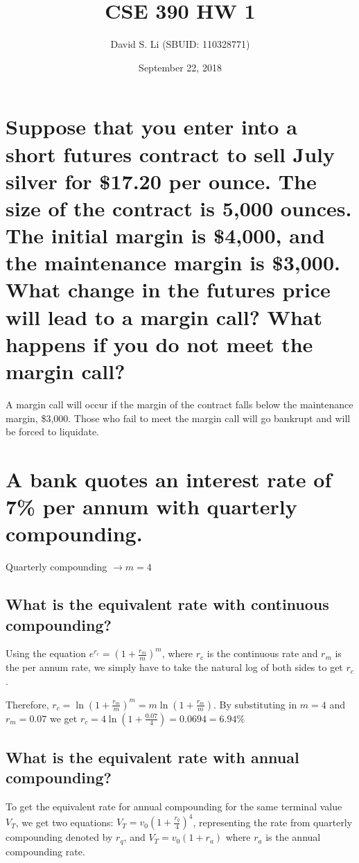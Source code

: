 \documentclass{article}
\title{CSE 390 HW 1}
\author{David S. Li (SBUID: 110328771)}
\date{September 22, 2018}
\begin{document}
\maketitle

\section{Suppose that you enter into a short futures contract to sell July silver for \$17.20 per ounce. The size of the contract is 5,000 ounces. The initial margin is \$4,000, and the maintenance margin is \$3,000. What change in the futures price will lead to a margin call? What happens if you do not meet the margin call?}

\par\noindent\large A margin call will occur if the margin of the contract falls below the maintenance margin, \$3,000.  Those who fail to meet the margin call will go bankrupt and will be forced to liquidate.

\section{A bank quotes an interest rate of 7\% per annum with quarterly compounding.}

\par\noindent\Large Quarterly compounding $\rightarrow m = 4$ 

\subsection{What is the equivalent rate with continuous compounding?}
\par\noindent\Large Using the equation $e^{r_{c}} = (1 + \frac{r_{m}}{m})^{m}$, where $r_{c}$ is the continuous rate and $r_{m}$ is the per annum rate, we simply have to take the natural log of both sides to get $r_{c}$.\vspace{0.25cm}
\par\noindent Therefore, $r_{c} = \ln{(1 + \frac{r_{m}}{m})}^{m} = m\ln{(1 + \frac{r_{m}}{m})}$.  By substituting in $m = 4$ and $r_{m} = 0.07$ we get $r_{c} =4\ln{(1 + \frac{0.07}{4})} = 0.0694 = 6.94\%$
\subsection{What is the equivalent rate with annual compounding?}
\par\noindent\Large To get the equivalent rate for annual compounding for the same terminal value $V_{T}$, we get two equations: $V_{T} = v_{0}(1 + \frac{r_{q}}{4})^{4}$, representing the rate from quarterly compounding denoted by $r_{q}$, and $V_{T} = v_{0}(1 + r_{a})$ where $r_{a}$ is the annual compounding rate.\vspace{0.25cm}
\end{document}
